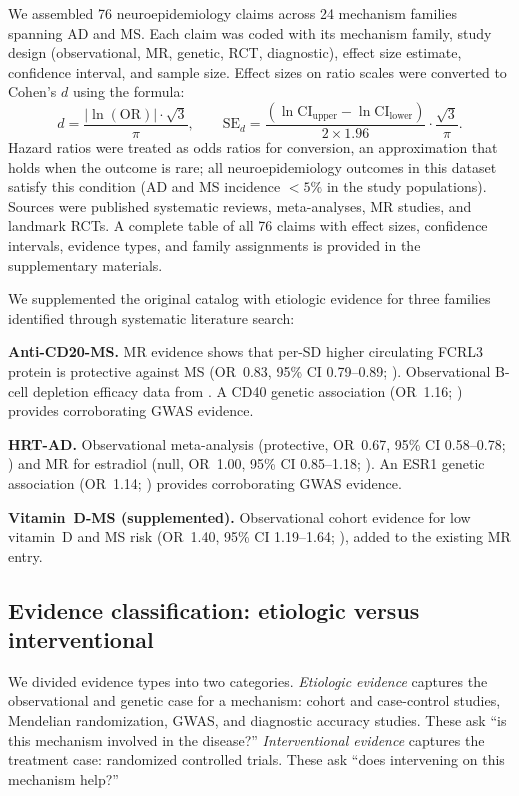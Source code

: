 \documentclass[11pt]{article}
\begin{document}
We assembled 76 neuroepidemiology claims across 24 mechanism families spanning AD and MS. Each claim was coded with its mechanism family, study design (observational, MR, genetic, RCT, diagnostic), effect size estimate, confidence interval, and sample size. Effect sizes on ratio scales were converted to Cohen's $d$ using the \citet{chinn2000} formula:
\begin{equation}
d = \frac{|\ln(\text{OR})| \cdot \sqrt{3}}{\pi}, \qquad
\text{SE}_d = \frac{(\ln\text{CI}_{\text{upper}} - \ln\text{CI}_{\text{lower}})}{2 \times 1.96} \cdot \frac{\sqrt{3}}{\pi}.
\label{eq:chinn}
\end{equation}
Hazard ratios were treated as odds ratios for conversion, an approximation that holds when the outcome is rare; all neuroepidemiology outcomes in this dataset satisfy this condition (AD and MS incidence $< 5\%$ in the study populations). Sources were published systematic reviews, meta-analyses, MR studies, and landmark RCTs. A complete table of all 76 claims with effect sizes, confidence intervals, evidence types, and family assignments is provided in the supplementary materials.

We supplemented the original catalog with etiologic evidence for three families identified through systematic literature search:

\textbf{Anti-CD20-MS.} MR evidence shows that per-SD higher circulating FCRL3 protein is protective against MS (OR~0.83, 95\% CI 0.79--0.89; \cite{lin2023}). Observational B-cell depletion efficacy data from \citet{hu2019}. A CD40 genetic association (OR~1.16; \cite{sokolova2013}) provides corroborating GWAS evidence.

\textbf{HRT-AD.} Observational meta-analysis (protective, OR~0.67, 95\% CI 0.58--0.78; \cite{song2020}) and MR for estradiol (null, OR~1.00, 95\% CI 0.85--1.18; \cite{barth2025}). An ESR1 genetic association (OR~1.14; \cite{cheng2014}) provides corroborating GWAS evidence.

\textbf{Vitamin~D-MS (supplemented).} Observational cohort evidence for low vitamin~D and MS risk (OR~1.40, 95\% CI 1.19--1.64; \cite{munger2006}), added to the existing MR entry.

\subsection{Evidence classification: etiologic versus interventional}

We divided evidence types into two categories. \emph{Etiologic evidence} captures the observational and genetic case for a mechanism: cohort and case-control studies, Mendelian randomization, GWAS, and diagnostic accuracy studies. These ask ``is this mechanism involved in the disease?'' \emph{Interventional evidence} captures the treatment case: randomized controlled trials. These ask ``does intervening on this mechanism help?''
\end{document}
